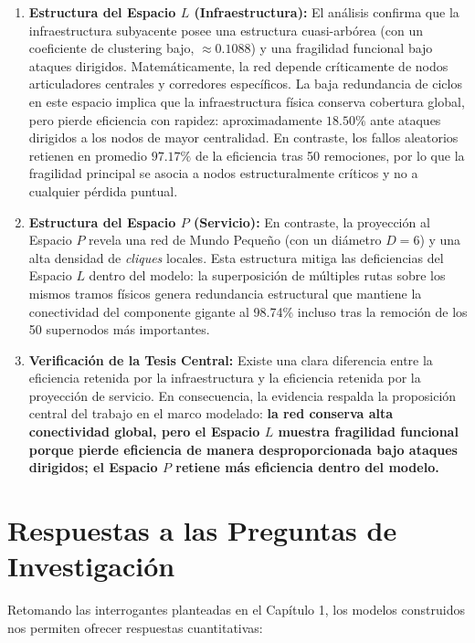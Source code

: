 \begin{enumerate}
    \item \textbf{Estructura del Espacio $L$ (Infraestructura):} El análisis confirma que la infraestructura subyacente posee una estructura cuasi-arbórea (con un coeficiente de clustering bajo, \(\approx 0.1088\)) y una fragilidad funcional bajo ataques dirigidos. Matemáticamente, la red depende críticamente de nodos articuladores centrales y corredores específicos. La baja redundancia de ciclos en este espacio implica que la infraestructura física conserva cobertura global, pero pierde eficiencia con rapidez: aproximadamente \(18.50\%\) ante ataques dirigidos a los nodos de mayor centralidad. En contraste, los fallos aleatorios retienen en promedio \(97.17\%\) de la eficiencia tras 50 remociones, por lo que la fragilidad principal se asocia a nodos estructuralmente críticos y no a cualquier pérdida puntual.

    \item \textbf{Estructura del Espacio $P$ (Servicio):} En contraste, la proyección al Espacio $P$ revela una red de Mundo Pequeño (con un diámetro $D=6$) y una alta densidad de \textit{cliques} locales. Esta estructura mitiga las deficiencias del Espacio $L$ dentro del modelo: la superposición de múltiples rutas sobre los mismos tramos físicos genera redundancia estructural que mantiene la conectividad del componente gigante al 98.74\% incluso tras la remoción de los 50 supernodos más importantes.

    \item \textbf{Verificación de la Tesis Central:} Existe una clara diferencia entre la eficiencia retenida por la infraestructura y la eficiencia retenida por la proyección de servicio. En consecuencia, la evidencia respalda la proposición central del trabajo en el marco modelado: \textbf{la red conserva alta conectividad global, pero el Espacio \(L\) muestra fragilidad funcional porque pierde eficiencia de manera desproporcionada bajo ataques dirigidos; el Espacio \(P\) retiene más eficiencia dentro del modelo.}
\end{enumerate}

\section{Respuestas a las Preguntas de Investigación}

Retomando las interrogantes planteadas en el Capítulo 1, los modelos construidos nos permiten ofrecer respuestas cuantitativas:


